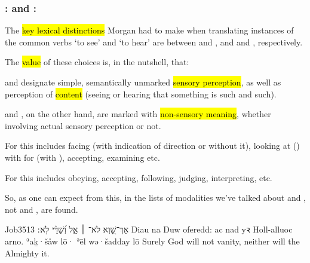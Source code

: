 \subsubsection{: and :}

\begin{paper}
	{\click} The \hl{key lexical distinctions} Morgan had to make when translating instances of the common verbs  ‘to see’ and  ‘to hear’ are between  and , and  and , respectively.

	{\click} The \hl{value} of these choices is, in the nutshell, that:
	\begin{compactitem}
		\item {} and  designate simple, semantically unmarked \hl{sensory perception}, as well as perception of \hl{content} (seeing or hearing that something is such and such).
		\item {} and , on the other hand, are marked with \hl{non-sensory meaning}, whether involving actual sensory perception or not.
			\begin{compactitem}
				\item For  this includes facing (with indication of direction or without it), looking at (\tounfold{}) with for (with ), accepting, examining etc.
				\item For  this includes obeying, accepting, following, judging, interpreting, etc.
			\end{compactitem}
	\end{compactitem}

	So, as one can expect from this, in the lists of modalities we’ve talked about  and , not  and , are found.
\end{paper}



\begin{example}{Job}{35}{13}{}{}
	\quoling
	{אַךְ־שָׁ֭וְא לֹא־ ׀ אֵ֑ל וְ֝שַׁדַּ֗י לֹ֣א ׃}
	{Diau na  Duw oferedd: ac nad  yꝛ Holl-alluoc arno.}
	{ʾaḵ·šåw lō· ʾēl wə·šadday lō }
	{Surely God will not  vanity, neither will the Almighty  it.}
\end{example}

